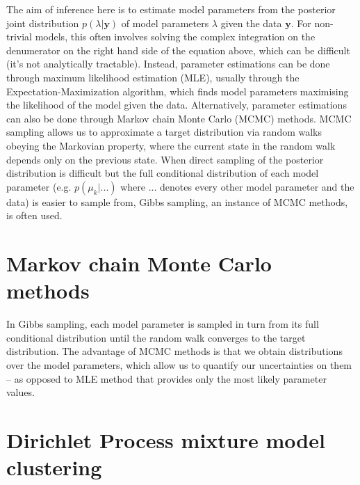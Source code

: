 The aim of inference here is to estimate model parameters from the posterior joint distribution $p(\lambda|\boldsymbol{y})$ of model parameters $\lambda$ given the data $\boldsymbol{y}$. For non-trivial models, this often involves solving the complex integration on the denumerator on the right hand side of the equation above, which can be difficult (it's not analytically tractable). Instead, parameter estimations can be done through maximum likelihood estimation (MLE), usually through the Expectation-Maximization algorithm, which finds model parameters maximising the likelihood of the model given the data. Alternatively, parameter estimations can also be done through Markov chain Monte Carlo (MCMC) methods. MCMC sampling allows us to approximate a target distribution via random walks obeying the Markovian property, where the current state in the random walk depends only on the previous state. When direct sampling of the posterior distribution is difficult but the full conditional distribution of each model parameter (e.g. $p(\mu_{k}|...)$ where ... denotes every other model parameter and the data) is easier to sample from, Gibbs sampling, an instance of MCMC methods, is often used. 

\section{Markov chain Monte Carlo methods}

In Gibbs sampling, each model parameter is sampled in turn from its full conditional distribution until the random walk converges to the target distribution. The advantage of MCMC methods is that we obtain distributions over the model parameters, which allow us to quantify our uncertainties on them -- as opposed to MLE method that provides only the most likely parameter values.

\section{Dirichlet Process mixture model clustering}

